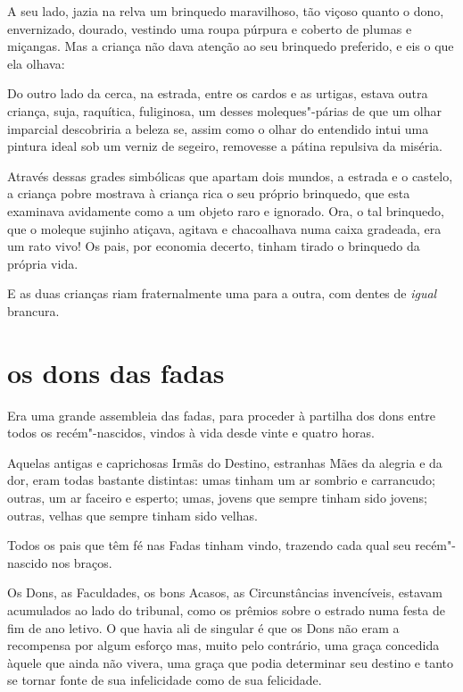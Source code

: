 A seu lado, jazia na relva um brinquedo maravilhoso, tão viçoso
quanto o dono, envernizado, dourado, vestindo uma roupa púrpura
e coberto de plumas e miçangas. Mas a criança não dava atenção ao seu
brinquedo preferido, e eis o que ela olhava:

Do outro lado da cerca, na estrada, entre os cardos e as urtigas, estava
outra criança, suja, raquítica, fuliginosa, um desses moleques"-párias
de que um olhar imparcial descobriria a beleza se, assim como o olhar do
entendido intui uma pintura ideal sob um verniz de segeiro,
removesse a pátina repulsiva da miséria.

Através dessas grades simbólicas que apartam dois mundos, a estrada e o
castelo, a criança pobre mostrava à criança rica o seu próprio
brinquedo, que esta examinava avidamente como a um objeto raro e
ignorado. Ora, o tal brinquedo, que o moleque sujinho atiçava,
agitava e chacoalhava numa caixa gradeada, era um rato vivo! Os pais,
por economia decerto, tinham tirado o brinquedo da própria vida.

E as duas crianças riam fraternalmente uma para a outra, com dentes de
\textit{igual} brancura.

\quebra\section[Os dons das fadas]{os dons das fadas}

Era uma grande assembleia das fadas, para proceder à partilha dos dons
entre todos os recém"-nascidos, vindos à vida desde vinte e quatro horas.

Aquelas antigas e caprichosas Irmãs do Destino,
estranhas Mães da alegria e da dor, eram todas bastante distintas: umas
tinham um ar sombrio e carrancudo; outras, um ar faceiro e esperto;
umas, jovens que sempre tinham sido jovens; outras, velhas que sempre
tinham sido velhas.

Todos os pais que têm fé nas Fadas tinham vindo, trazendo cada qual seu
recém"-nascido nos braços.

Os Dons, as Faculdades, os bons Acasos, as Circunstâncias invencíveis,
estavam acumulados ao lado do tribunal, como os prêmios sobre o estrado
numa festa de fim de ano letivo. O que havia ali de singular é que os
Dons não eram a recompensa por algum esforço mas, muito pelo contrário,
uma graça concedida àquele que ainda não vivera, uma graça que podia
determinar seu destino e tanto se tornar fonte de sua infelicidade
como de sua felicidade.

